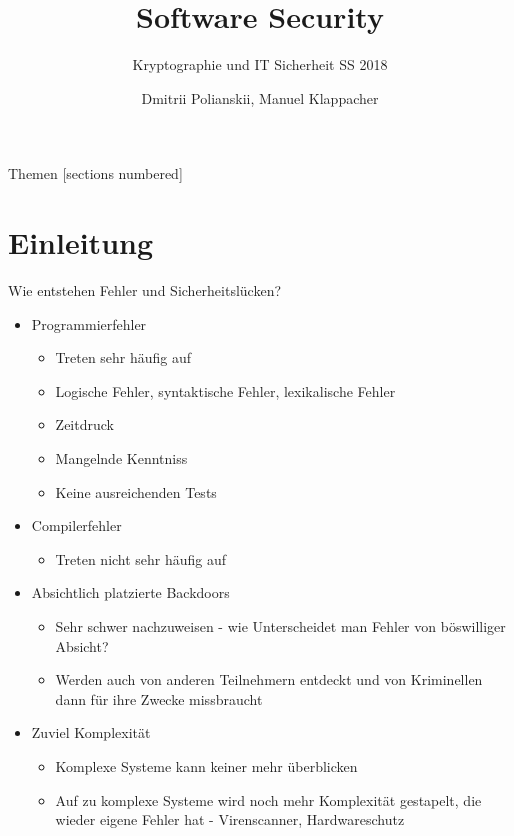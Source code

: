 \documentclass[10pt]{beamer}
\title{Software Security}
\subtitle{Kryptographie und IT Sicherheit SS 2018}
\date{}
\author{Dmitrii Polianskii, Manuel Klappacher}
\institute{Universit\"at Salzburg}
\begin{document}
\maketitle

\begin{frame}{Themen}
  [sections numbered]
  \tableofcontents[hideallsubsections]
\end{frame}


\section{Einleitung}

\begin{frame}[fragile]{Wie entstehen Fehler und Sicherheitsl\"ucken?}
  \begin{itemize}
    \item Programmierfehler
      \begin{itemize}
        \item Treten sehr h\"aufig auf
        \item Logische Fehler, syntaktische Fehler, lexikalische Fehler
        \item Zeitdruck
        \item Mangelnde Kenntniss
        \item Keine ausreichenden Tests
      \end{itemize}
    \item Compilerfehler
      \begin{itemize}
        \item Treten nicht sehr h\"aufig auf
      \end{itemize}
    \item Absichtlich platzierte Backdoors
      \begin{itemize}
        \item Sehr schwer nachzuweisen - wie Unterscheidet man Fehler von b\"oswilliger Absicht?
        \item Werden auch von anderen Teilnehmern entdeckt und von Kriminellen dann f\"ur ihre Zwecke missbraucht
      \end{itemize}
    \item Zuviel Komplexit\"at
      \begin{itemize}
        \item Komplexe Systeme kann keiner mehr \"uberblicken
        \item Auf zu komplexe Systeme wird noch mehr Komplexit\"at gestapelt, die wieder eigene Fehler hat - Virenscanner, Hardwareschutz
      \end{itemize}
  \end{itemize}
\end{frame}
\end{document}
